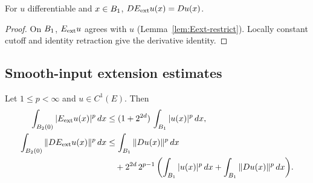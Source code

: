 \begin{lemma}
\label{lem:fderiv_unitBallExtension_eq_of_mem_ball}
\leanok
{}
For $u$ differentiable and $x \in B_{1}$, $DE_{\mathrm{ext}} u (x) = Du(x)$.
\end{lemma}

\begin{proof}
\leanok
{}

On $B_{1}$, $E_{\mathrm{ext}} u$ agrees with $u$ (Lemma~\ref{lem:Eext-restrict}).
Locally constant cutoff and identity retraction give the derivative
identity.
\end{proof}

\subsection*{Smooth-input extension estimates}

\begin{theorem}
\label{thm:smooth-extension-estimate}
\leanok
{}
Let $1 \le p < \infty$ and $u \in C^1(E)$. Then
\begin{align*}
\int_{B_{2}(0)} |E_{\mathrm{ext}} u (x)|^p\,dx
&\le (1 + 2^{2d})\, \int_{B_{1}} |u(x)|^p\,dx, \\
\int_{B_{2}(0)} \|DE_{\mathrm{ext}} u (x)\|^p\,dx
&\le \int_{B_{1}} \|Du(x)\|^p\,dx \\
&\quad + 2^{2d}\,2^{p-1}\,\biggl(\int_{B_{1}} |u(x)|^p\,dx
+ \int_{B_{1}} \|Du(x)\|^p\,dx\biggr).
\end{align*}
\end{theorem}

